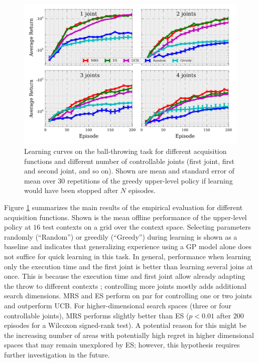 \documentclass[10pt,letterpaper]{article} %
\begin{document}
\begin{figure}
\centering
\includegraphics[width=.85\textwidth]{learning_curve}
\caption{Learning curves on the ball-throwing task for different acquisition functions and different number of controllable joints (first joint, first and second joint, and so on). Shown are mean and standard error of mean over $30$ repetitions of the greedy upper-level policy if learning would have been stopped after $N$ episodes.}
\label{fig:experiment}
\end{figure}

Figure \ref{fig:experiment} summarizes the main results of the empirical
evaluation for different acquisition functions. Shown is the mean offline
performance of the upper-level policy at $16$ test contexts on a grid over the
context space. Selecting parameters randomly (``Random'') or greedily
(``Greedy'') during learning is shown as a baseline and indicates that
generalizing experience using a GP model alone does not suffice for quick
learning in this task. In general, performance when learning only the execution
time and the first joint is better than learning several joins at once. This is
because the execution time and first joint allow already adapting the throw to
different contexts \citep{metzen_bayesian_2015}; controlling more joints mostly
adds additional search dimensions. MRS and ES perform on par for controlling one
or two joints and outperform UCB. For higher-dimensional search spaces (three or
four controllable joints), MRS performs slightly better than ES ($p < 0.01$ after $200$ episodes for
a Wilcoxon signed-rank test). A potential reason for this might be the increasing number of areas with potentially high regret in higher dimensional spaces that may remain unexplored by ES; however, this hypothesis requires further investigation in the future.
\end{document}

